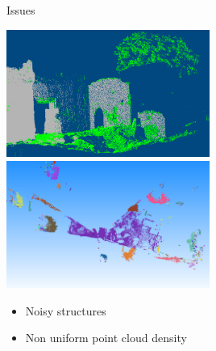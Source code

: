 \documentclass{beamer}
\begin{document}
\begin{frame}{Issues}

\includegraphics[width=0.50\textwidth]{pics/vrmesh-veg.png}
\includegraphics[width=0.50\textwidth]{pics/clustering.png}

\begin{itemize}
\item Noisy structures
\item Non uniform point cloud density
\end{itemize}


\end{frame}
\end{document}
